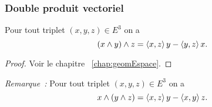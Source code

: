 \subsubsection{Double produit vectoriel}

\begin{theo}
  Pour tout triplet \((x,y,z) \in E^3\) on a
  \begin{equation}
    (x \wedge y)\wedge z = \left\langle{x},{z}\right\rangle y-\left\langle{y},{z}\right\rangle x.
  \end{equation}
\end{theo}
\begin{proof}
  Voir le chapitre~
  \ref{chap:geomEspace}.
\end{proof}
\emph{Remarque~:} Pour tout triplet \((x,y,z) \in E^3\) on a
\begin{equation}
  x \wedge (y \wedge z) = \left\langle{x},{z}\right\rangle y-\left\langle{x},{y}\right\rangle z.
\end{equation}
